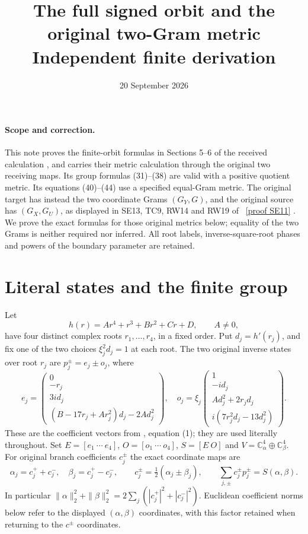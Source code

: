 \documentclass[11pt]{article}
\title{The full signed orbit and the original two-Gram metric\\
Independent finite derivation}
\author{}
\date{20 September 2026}
\newcommand{\C}{\mathbb C}
\begin{document}
\maketitle

\paragraph{Scope and correction.}
This note proves the finite-orbit formulas in Sections 5--6 of the
received calculation \cite{Incoming}, and carries their metric calculation
through the original two receiving maps.  Its group formulas (31)--(38)
are valid with a positive quotient metric.  Its equations (40)--(44)
use a specified equal-Gram metric.  The original target has instead
the two coordinate Grams $(G_Y,G)$, and the original source has
$(G_X,G_U)$, as displayed in SE13, TC9, RW14 and RW19 of \cite{Fable}%
~\href{https://github.com/KokunoYumeto/zeta-function-research-reader/blob/5992ad50c0f2a06921f1fcaded7b4e38097c0739/workbenches/splitzero-tandem/continuations/20260920-original-kernel-mixed-determinants/providers/FABLE_TO_ORIGINAL_CONDUCTOR.tex\#L1967}{[proof SE11]}%
{}.
We prove the exact formulas for those original metrics below; equality
of the two Grams is neither required nor inferred.
All root labels, inverse-square-root phases and powers of the boundary
parameter are retained.

\section{Literal states and the finite group}
Let
\[
 h(r)=Ar^4+r^3+Br^2+Cr+D,\qquad A\ne0,
 \tag{OM1}
\]
have four distinct complex roots $r_1,\ldots,r_4$, in a fixed order.
Put $d_j=h'(r_j)$, and fix one of the two choices
$\xi_j^2d_j=1$ at each root.  The two original inverse states over
root $r_j$ are $p_j^\pm=e_j\pm o_j$, where
\[
e_j=\begin{pmatrix}
0\\-r_j\\3id_j\\(B-17r_j+Ar_j^2)d_j-2Ad_j^2
\end{pmatrix},\quad
o_j=\xi_j\begin{pmatrix}
1\\-id_j\\Ad_j^2+2r_jd_j\\i(7r_j^2d_j-13d_j^2)
\end{pmatrix}.
\tag{OM2}
\]
These are the coefficient vectors from \cite{Incoming}, equation (1);
they are used literally throughout.  Set $E=[e_1\ \cdots\ e_4]$,
$O=[o_1\ \cdots\ o_4]$, $S=[E\ O]$ and
$V=\C^4_\alpha\oplus\C^4_\beta$.  For original branch coefficients
$c_j^\pm$ the exact coordinate maps are
\[
\alpha_j=c_j^++c_j^-,\quad \beta_j=c_j^+-c_j^-,
\qquad c_j^\pm=\tfrac12(\alpha_j\pm\beta_j),
\qquad \sum_{j,\pm}c_j^\pm p_j^\pm=S(\alpha,\beta).
\tag{OM3}
\]
In particular $\|\alpha\|_2^2+\|\beta\|_2^2=
2\sum_j(|c_j^+|^2+|c_j^-|^2)$.  Euclidean coefficient norms below
refer to the displayed $(\alpha,\beta)$ coordinates, with this factor
retained when returning to the $c^\pm$ coordinates.
\end{document}
